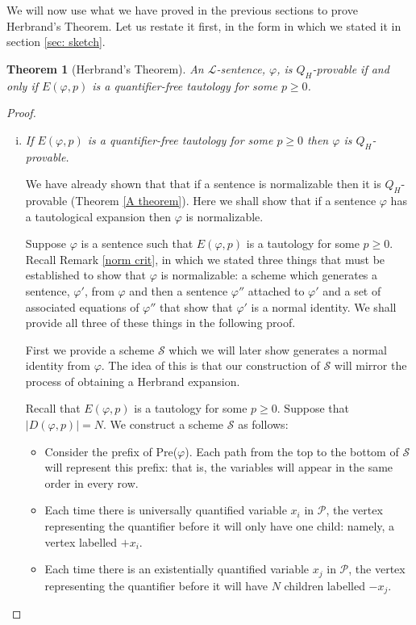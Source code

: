 \documentclass[a4paper,12pt]{report}
\newtheorem{theo}{Theorem}
\theoremstyle{definition}
\begin{document}
We will now use what we have proved in the previous sections to prove Herbrand's Theorem. Let us restate it first, in the form in which we stated it in section \ref{sec: sketch}.
\addtocounter{theo}{-5}
\begin{theo}[Herbrand's Theorem]
An $\mathcal{L}$-sentence, $\varphi$, is $Q_H$-provable if and only if $E(\varphi, p)$ is a quantifier-free tautology for some $p \ge 0$.
\end{theo}
\begin{proof}
\begin{enumerate}[(i)] 
\item \emph{If $E(\varphi, p)$ is a quantifier-free tautology for some $p \ge 0$ then $\varphi$ is $Q_H$-provable.}

We have already shown that that if a sentence is normalizable then it is $Q_H$-provable (Theorem \ref{A theorem}). Here we shall show that if a sentence $\varphi$ has a tautological expansion then $\varphi$ is normalizable.

Suppose $\varphi$ is a sentence such that $E(\varphi, p)$ is a tautology for some $p \ge 0$. Recall Remark \ref{norm crit}, in which we stated three things that must be established to show that $\varphi$ is normalizable: a scheme which generates a sentence, $\varphi'$, from $\varphi$ and then a sentence $\varphi''$ attached to $\varphi'$ and a set of associated equations of $\varphi''$ that show that $\varphi'$ is a normal identity. We shall provide all three of these things in the following proof.

First we provide a scheme $\mathcal{S}$ which we will later show generates a normal identity from $\varphi$. The idea of this is that our construction of $\mathcal{S}$ will mirror the process of obtaining a Herbrand expansion.

Recall that $E(\varphi, p)$ is a tautology for some $p \ge 0$. Suppose that $ | D(\varphi , p) | = N $. We construct a scheme $\mathcal{S}$ as follows:
\begin{itemize}
\item Consider the prefix of Pre($\varphi$). Each path from the top to the bottom of $\mathcal{S}$ will represent this prefix: that is, the variables will appear in the same order in every row.
\item Each time there is universally quantified variable $x_i$ in $\mathcal{P}$, the vertex representing the quantifier before it will only have one child: namely, a vertex labelled $+x_i$. 
\item Each time there is an existentially quantified variable $x_j$ in $\mathcal{P}$, the vertex representing the quantifier before it will have $N$ children labelled $-x_j$.
\end{itemize}


\end{enumerate}
\end{proof}
\end{document}
